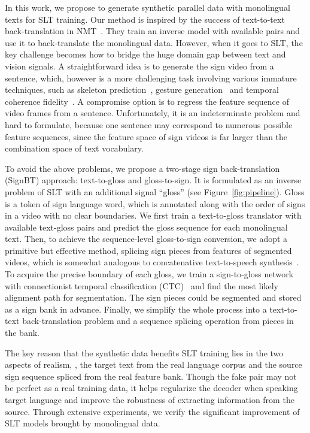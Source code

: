 \documentclass[final]{cvpr}
\begin{document}
In this work, we propose to generate synthetic parallel data with monolingual texts for SLT training. 
Our method is inspired by the success of text-to-text back-translation in NMT~\cite{backtranslationACL16}. 
They train an inverse model with available pairs and use it to back-translate the monolingual data. 
However, when it goes to SLT, 
the key challenge becomes how to bridge the huge domain gap between text and vision signals. 
A straightforward idea is to generate the sign video from a sentence, which, 
however is a more challenging task involving various immature techniques, such as skeleton prediction~\cite{SLG-ECCV20}, gesture generation~\cite{SLG-TMM-THU-20} and temporal coherence fidelity~\cite{MonkeyNet-CVPR19}. 
A compromise option is to regress the feature sequence of video frames from a sentence. 
Unfortunately, it is an indeterminate problem and hard to formulate, because one sentence may correspond to numerous possible feature sequences, since the feature space of sign videos is far larger than the combination space of text vocabulary. 

To avoid the above problems, we propose a two-stage sign back-translation (SignBT) approach: text-to-gloss and gloss-to-sign. 
It is formulated as an inverse problem of SLT with an additional signal ``gloss'' (see Figure~\ref{fig:pipeline}). 
Gloss is a token of sign language word, which is annotated along with the order of signs in a video with no clear boundaries. 
We first train a text-to-gloss translator with available text-gloss pairs and predict the gloss sequence for each monolingual text. 
Then, to achieve the sequence-level gloss-to-sign conversion, we adopt a primitive but effective method, splicing sign pieces from features of segmented videos, which is somewhat analogous to concatenative text-to-speech synthesis~\cite{hunt1996unit,taylor2009text}. 
To acquire the precise boundary of each gloss, we train a sign-to-gloss network with connectionist temporal classification (CTC)~\cite{CTCLoss} and find the most likely alignment path for segmentation. 
The sign pieces could be segmented and stored as a sign bank in advance. 
Finally, we simplify the whole process into a text-to-text back-translation problem and a sequence splicing operation from pieces in the bank. 

The key reason that the synthetic data benefits SLT training lies in the two aspects of realism, 
\ie, the target text from the real language corpus and the source sign sequence spliced from the real feature bank. 
Though the fake pair may not be perfect as a real training data, it helps regularize the decoder when speaking target language and improve the robustness of extracting information from the source. 
Through extensive experiments, we verify the significant improvement of SLT models brought by monolingual data. 
\end{document}
